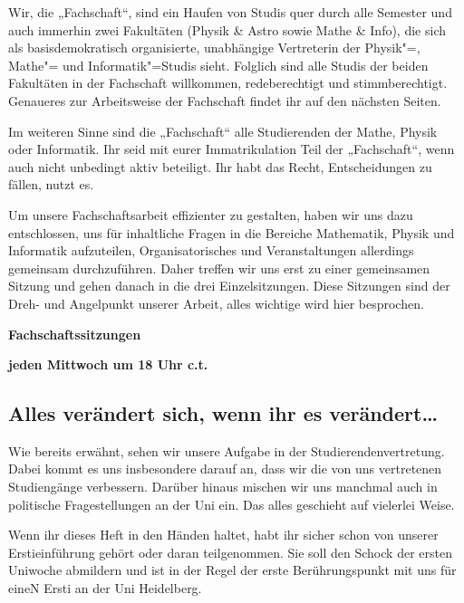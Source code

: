 Wir, die „Fachschaft“, sind ein Haufen von Studis quer durch alle Semester und auch immerhin zwei Fakultäten (Physik \& Astro sowie Mathe \& Info), die sich als basisdemokratisch organisierte, unabhängige Vertreterin der Physik"=, Mathe"= und Informatik"=Studis sieht. Folglich sind alle Studis der beiden Fakultäten in der Fachschaft willkommen, redeberechtigt und stimmberechtigt. Genaueres zur Arbeitsweise der Fachschaft findet ihr auf den nächsten Seiten.

Im weiteren Sinne sind die „Fachschaft“ alle Studierenden der Mathe, Physik oder Informatik. Ihr seid mit eurer Immatrikulation Teil der „Fachschaft“, wenn auch nicht unbedingt aktiv beteiligt. Ihr habt das Recht, Entscheidungen zu fällen, nutzt es.

Um unsere Fachschaftsarbeit effizienter zu gestalten, haben wir uns dazu entschlossen, uns für inhaltliche Fragen in die Bereiche Mathematik, Physik und Informatik aufzuteilen, Organisatorisches und Veranstaltungen allerdings gemeinsam durchzuführen. Daher treffen wir uns erst zu einer gemeinsamen Sitzung und gehen danach in die drei Einzelsitzungen. Diese Sitzungen sind der Dreh- und Angelpunkt unserer Arbeit, alles wichtige wird hier besprochen.

\begin{center}
\large
\textbf{Fachschaftssitzungen}

\textbf{jeden Mittwoch um 18 Uhr \gls{c.t.}}
\end{center}

\begin{figure}[b]

\end{figure}

\subsection{Alles verändert sich, wenn ihr es verändert\dots}
Wie bereits erwähnt, sehen wir unsere Aufgabe in der Studierendenvertretung. Dabei kommt es uns insbesondere darauf an, dass wir die von uns vertretenen Studiengänge verbessern. Darüber hinaus mischen wir uns manchmal auch in politische Fragestellungen an der Uni ein. Das alles geschieht auf vielerlei Weise.

Wenn ihr dieses Heft in den Händen haltet, habt ihr sicher schon von unserer Erstieinführung gehört oder daran teilgenommen. Sie soll den Schock der ersten Uniwoche abmildern und ist in der Regel der erste Berührungspunkt mit uns für eineN Ersti an der Uni Heidelberg.

